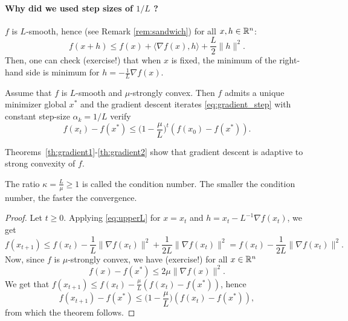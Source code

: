 \documentclass[11pt,nocut]{article}
\begin{document}
\paragraph{Why did we used step sizes of $1/L$ ?} $f$ is $L$-smooth, hence (see Remark \ref{rem:sandwich}) for all $x,h \in \mathbb{R}^n$:
\begin{equation}\label{eq:upperL}
f(x+h) \leq f(x) + \langle \nabla f(x) , h \rangle + \frac{L}{2} \|h\|^2.
\end{equation}
Then, one can check (exercise!) that when $x$ is fixed, the minimum of the right-hand side is minimum for $h = - \frac{1}{L} \nabla f(x)$.

\begin{theorem}\label{th:gradient2}
	Assume that $f$ is $L$-smooth and $\mu$-strongly convex. 
	Then $f$ admits a unique minimizer global $x^*$ and
	the gradient descent iterates \eqref{eq:gradient_step} with constant step-size $\alpha_k = 1/L$ verify
	$$
	f(x_t) - f(x^*) \leq \Big(1-\frac{\mu}{L}\Big)^t (f(x_0) - f(x^*)).
	$$
\end{theorem}
\begin{remark}
	Theorems~\ref{th:gradient1}-\ref{th:gradient2} show that gradient descent is adaptive to strong convexity of $f$.
\end{remark}
\begin{remark}
	The ratio $\kappa = \frac{L}{\mu} \geq 1$ is called the condition number. The smaller the condition number, the faster the convergence.
\end{remark}

\begin{proof}
	Let $t \geq 0$. Applying \eqref{eq:upperL} for $x=x_t$ and $h=x_t - L^{-1} \nabla f(x_t)$, we get
	$$
	f(x_{t+1}) 
	\leq f(x_t) - \frac{1}{L} \|\nabla f(x_t) \|^2 + \frac{1}{2L}\|\nabla f(x_t) \|^2
	= f(x_t) - \frac{1}{2L} \|\nabla f(x_t) \|^2.
	$$
	Now, since $f$ is $\mu$-strongly convex, we have (exercise!) for all $x \in \mathbb{R}^n$
	\begin{equation}\label{eq:boundG}
f(x) - f(x^*) \leq 2 \mu \|\nabla f(x)\|^2.
	\end{equation}
We get that $f(x_{t+1}) \leq f(x_t) - \frac{\mu}{L}(f(x_t) - f(x^*))$, hence
$$
f(x_{t+1}) - f(x^*) \leq \Big(1 - \frac{\mu}{L}\Big)(f(x_t) - f(x^*)),
$$
from which the theorem follows.
\end{proof}
\end{document}

